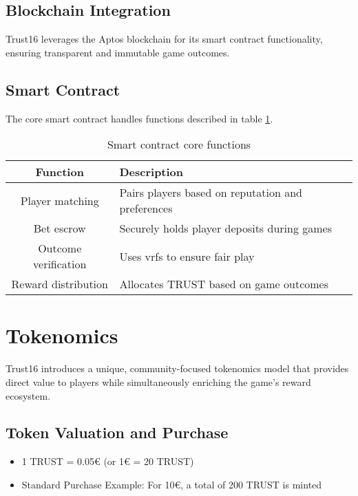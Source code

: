 \documentclass[table, twocolumn]{article}
\begin{document}
\subsection{Blockchain Integration}
Trust16 leverages the Aptos blockchain for its smart contract functionality, ensuring
transparent and immutable game outcomes.

\subsection{Smart Contract}
The core smart contract handles functions described in table \ref{tab:smart-contract-functions}.

\begin{table}[!htb]
  \centering
  \begin{tabular}{|c|p{5cm}|}
    \hline \rowcolor{gray!20}
    Function        & Description                                        \\ \hline
    Player matching & Pairs players based on reputation and preferences  \\ \hline
    Bet escrow      & Securely holds player deposits during games        \\ \hline
    Outcome verification & Uses \glspl{vrf} to ensure fair play          \\ \hline
    Reward distribution  & Allocates TRUST based on game outcomes        \\ \hline
  \end{tabular}
  \caption{Smart contract core functions}
  \label{tab:smart-contract-functions}
\end{table}

\section{Tokenomics} \label{sec:tokenomics}

Trust16 introduces a unique, community-focused tokenomics model that provides direct
value to players while simultaneously enriching the game's reward ecosystem.

\subsection{Token Valuation and Purchase}
\begin{itemize}
    \item 1 TRUST = 0.05€ (or 1€ = 20 TRUST)
    \item Standard Purchase Example: For 10€, a total of 200 TRUST is minted
\end{itemize}
\end{document}
